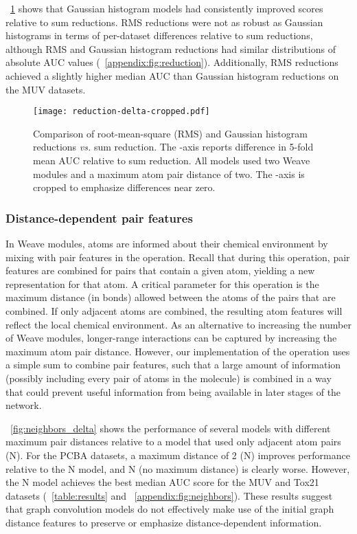 \figurename~\ref{fig:reduction_delta} shows that Gaussian histogram models had
consistently improved scores relative to sum reductions. RMS reductions were not
as robust as Gaussian histograms in terms of per-dataset differences relative to
sum reductions, although RMS and Gaussian histogram reductions had similar
distributions of absolute AUC values (\figurename~\ref{appendix:fig:reduction}).
Additionally, RMS reductions achieved a slightly higher median AUC than Gaussian
histogram reductions on the MUV datasets.

\begin{figure}[tb]
\centering
  \texttt{[image: reduction-delta-cropped.pdf]}
  \caption{
    Comparison of root-mean-square (RMS) and Gaussian histogram reductions
    \emph{vs.} sum reduction. The -axis reports difference in 5-fold mean AUC
    relative to sum reduction. All models used two Weave modules and a maximum
    atom pair distance of two. The -axis is cropped to emphasize differences
    near zero.
  }
  \label{fig:reduction_delta}
\end{figure}

\subsubsection{Distance-dependent pair features}
\label{sec:neighbors}

In Weave modules, atoms are informed about their chemical environment by
mixing with pair features in the  operation. Recall that during
this operation, pair features are combined for pairs that contain a given
atom, yielding a new representation for that atom. A critical parameter for this
operation is the maximum distance (in bonds) allowed between the atoms of the
pairs that are combined. If only adjacent atoms are combined, the resulting
atom features will reflect the local chemical environment. As an alternative to
increasing the number of Weave modules, longer-range interactions can be
captured by increasing the maximum atom pair distance. However, our
implementation of the  operation uses a simple sum to combine
pair features, such that a large amount of information (possibly including every
pair of atoms in the molecule) is combined in a way that could prevent
useful information from being available in later stages of the network.

\figurename~\ref{fig:neighbors_delta} shows the performance of several models
with different maximum pair distances relative to a model that used only
adjacent atom pairs (N). For the PCBA datasets, a maximum distance of 2
(N) improves performance relative to the N model, and N (no
maximum distance) is clearly worse. However, the N model achieves the best
median AUC score for the MUV and Tox21 datasets (\tablename~\ref{table:results}
and \figurename~\ref{appendix:fig:neighbors}). These results suggest that graph convolution models do not
effectively make use of the initial graph distance features to preserve or
emphasize distance-dependent information.

